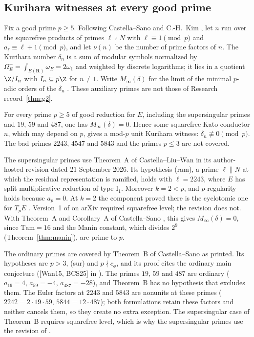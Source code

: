 \subsection{Kurihara witnesses at every good prime}\label{subsec:kurihara}
Fix a good prime $p\ge5$. Following Castella--Sano \cite[\S1.1]{castellasano} and C.-H.~Kim \cite{kimch}, let $n$ run over the squarefree products of primes $\ell\nmid N$ with $\ell\equiv1\pmod p$ and $a_\ell\equiv\ell+1\pmod p$, and let $\nu(n)$ be the number of prime factors of $n$. The Kurihara number $\delta_n$ is a sum of modular symbols normalized by $\Omega^+_E=\int_{E(\mathbf R)}\omega_E=2\omega_1$ and weighted by discrete logarithms; it lies in a quotient $\Z/I_n$ with $I_n\subseteq p\Z$ for $n\ne1$. Write $M_\infty(\delta)$ for the limit of the minimal $p$-adic orders of the $\delta_n$ \cite[\S1.1.3]{castellasano}. These auxiliary primes are not those of Research record~\ref{thm:g2}.

\begin{researchrecord}\label{thm:kurexist}
For every prime $p\ge5$ of good reduction for $E$, including the supersingular primes and $19$, $59$ and $487$, one has $M_\infty(\delta)=0$. Hence some squarefree Kato conductor $n$, which may depend on $p$, gives a mod-$p$ unit Kurihara witness: $\delta_n\not\equiv0\pmod p$. The bad primes $2243$, $4547$ and $5843$ and the primes $p\le3$ are not covered.
\end{researchrecord}
The supersingular primes use Theorem~A of Castella--Liu--Wan \cite{clw} in its author-hosted revision dated 21 September 2026. Its hypothesis (ram), a prime $\ell\parallel N$ at which the residual representation is ramified, holds with $\ell=2243$, where $E$ has split multiplicative reduction of type $\mathrm I_1$. Moreover $k=2<p$, and $p$-regularity holds because $a_p=0$. At $k=2$ the component proved there is the cyclotomic one for $T_pE$ \cite[Remark~2.20]{clw}. Version~1 of \cite{clw} on arXiv required squarefree level; the revision does not. With Theorem~A and Corollary~A of Castella--Sano \cite{castellasano}, this gives $M_\infty(\delta)=0$, since $\mathrm{Tam}=16$ and the Manin constant, which divides $2^9$ (Theorem~\ref{thm:manin}), are prime to $p$.

The ordinary primes are covered by Theorem~B of Castella--Sano as printed. Its hypotheses are $p>3$, (sur) and $p\nmid c_\phi$, and its proof cites the ordinary main conjecture ([Wan15, BCS25] in \cite{castellasano}). The primes $19$, $59$ and $487$ are ordinary ($a_{19}=4$, $a_{59}=-4$, $a_{487}=-28$), and Theorem~B has no hypothesis that excludes them. The Euler factors at $2243$ and $5843$ are nonunits at these primes ($2242=2\cdot19\cdot59$, $5844=12\cdot487$); both formulations retain these factors and neither cancels them, so they create no extra exception. The supersingular case of Theorem~B requires squarefree level, which is why the supersingular primes use the revision of \cite{clw}.

